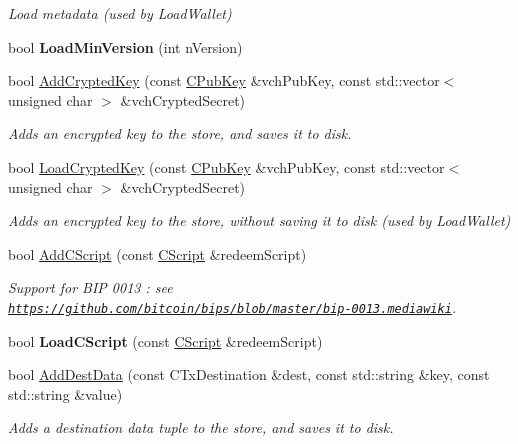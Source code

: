 \begin{DoxyCompactItemize}
\begin{DoxyCompactList}\small\item\em Load metadata (used by Load\+Wallet) \end{DoxyCompactList}\item 
\mbox{\label{class_c_wallet_a88317da8dab80135b8db73e945e15b60}} 
bool {\bfseries Load\+Min\+Version} (int n\+Version)
\item 
bool \mbox{\hyperlink{group__map_wallet_ga3e90096a903d49cd751f05fcdb7692ce}{Add\+Crypted\+Key}} (const \mbox{\hyperlink{class_c_pub_key}{C\+Pub\+Key}} \&vch\+Pub\+Key, const std\+::vector$<$ unsigned char $>$ \&vch\+Crypted\+Secret)
\begin{DoxyCompactList}\small\item\em Adds an encrypted key to the store, and saves it to disk. \end{DoxyCompactList}\item 
bool \mbox{\hyperlink{group__map_wallet_ga01fbd78238d4ef833d059f12a7e8ac9f}{Load\+Crypted\+Key}} (const \mbox{\hyperlink{class_c_pub_key}{C\+Pub\+Key}} \&vch\+Pub\+Key, const std\+::vector$<$ unsigned char $>$ \&vch\+Crypted\+Secret)
\begin{DoxyCompactList}\small\item\em Adds an encrypted key to the store, without saving it to disk (used by Load\+Wallet) \end{DoxyCompactList}\item 
bool \mbox{\hyperlink{group__map_wallet_gad7edacad1c926bc4b7fe0dc1be95ce31}{Add\+C\+Script}} (const \mbox{\hyperlink{class_c_script}{C\+Script}} \&redeem\+Script)
\begin{DoxyCompactList}\small\item\em Support for B\+IP 0013 \+: see \href{https://github.com/bitcoin/bips/blob/master/bip-0013.mediawiki}{\tt https\+://github.\+com/bitcoin/bips/blob/master/bip-\/0013.\+mediawiki}. \end{DoxyCompactList}\item 
bool {\bfseries Load\+C\+Script} (const \mbox{\hyperlink{class_c_script}{C\+Script}} \&redeem\+Script)
\item 
\mbox{\label{class_c_wallet_acbeae89a10e129930e5059d9167697e5}} 
bool \mbox{\hyperlink{class_c_wallet_acbeae89a10e129930e5059d9167697e5}{Add\+Dest\+Data}} (const C\+Tx\+Destination \&dest, const std\+::string \&key, const std\+::string \&value)
\begin{DoxyCompactList}\small\item\em Adds a destination data tuple to the store, and saves it to disk. \end{DoxyCompactList}\item 

\end{DoxyCompactItemize}
